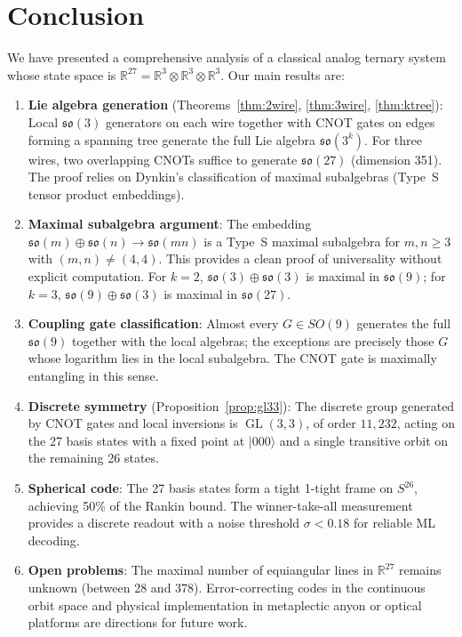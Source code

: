 \documentclass[12pt,a4paper]{article}
\newcommand{\GL}{\operatorname{GL}}
\begin{document}
\section{Conclusion}

We have presented a comprehensive analysis of a classical analog ternary
system whose state space is $\mathbb{R}^{27} = \mathbb{R}^3 \otimes
\mathbb{R}^3 \otimes \mathbb{R}^3$. Our main results are:

\begin{enumerate}
\item \textbf{Lie algebra generation} (Theorems~\ref{thm:2wire},
\ref{thm:3wire}, \ref{thm:ktree}): Local $\mathfrak{so}(3)$ generators
on each wire together with CNOT gates on edges forming a spanning tree
generate the full Lie algebra $\mathfrak{so}(3^k)$. For three wires,
two overlapping CNOTs suffice to generate $\mathfrak{so}(27)$ (dimension
351). The proof relies on Dynkin's classification of maximal subalgebras
(Type~S tensor product embeddings).

\item \textbf{Maximal subalgebra argument}: The embedding
$\mathfrak{so}(m) \oplus \mathfrak{so}(n) \to \mathfrak{so}(mn)$ is
a Type~S maximal subalgebra for $m,n \ge 3$ with $(m,n) \neq (4,4)$.
This provides a clean proof of universality without explicit computation.
For $k=2$, $\mathfrak{so}(3) \oplus \mathfrak{so}(3)$ is maximal in
$\mathfrak{so}(9)$; for $k=3$, $\mathfrak{so}(9) \oplus \mathfrak{so}(3)$
is maximal in $\mathfrak{so}(27)$.

\item \textbf{Coupling gate classification}: Almost every $G \in SO(9)$
generates the full $\mathfrak{so}(9)$ together with the local algebras;
the exceptions are precisely those $G$ whose logarithm lies in the local
subalgebra. The CNOT gate is maximally entangling in this sense.

\item \textbf{Discrete symmetry} (Proposition~\ref{prop:gl33}): The
discrete group generated by CNOT gates and local inversions is
$\GL(3,3)$, of order $11{,}232$, acting on the 27 basis states with
a fixed point at $|000\rangle$ and a single transitive orbit on the
remaining 26 states.

\item \textbf{Spherical code}: The 27 basis states form a tight 1-tight
frame on $S^{26}$, achieving 50\% of the Rankin bound. The winner-take-all
measurement provides a discrete readout with a noise threshold
$\sigma < 0.18$ for reliable ML decoding.

\item \textbf{Open problems}: The maximal number of equiangular lines in
$\mathbb{R}^{27}$ remains unknown (between 28 and 378). Error-correcting
codes in the continuous orbit space and physical implementation in
metaplectic anyon or optical platforms are directions for future work.
\end{enumerate}
\end{document}
